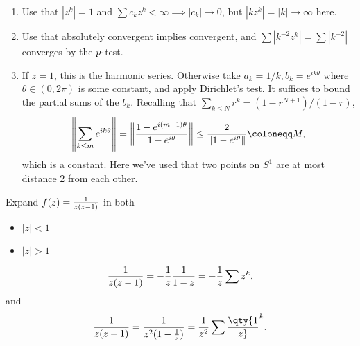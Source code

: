 \begin{solution}

\begin{enumerate}
\def\labelenumi{\arabic{enumi}.}
\tightlist
\item
  Use that \({\left\lvert {z^k} \right\rvert} = 1\) and
  \(\sum c_kz^k < \infty \implies {\left\lvert {c_k} \right\rvert} \to 0\),
  but
  \({\left\lvert {kz^k} \right\rvert} = {\left\lvert {k} \right\rvert} \to \infty\)
  here.
\item
  Use that absolutely convergent implies convergent, and
  \(\sum {\left\lvert {k^{-2} z^k} \right\rvert} = \sum {\left\lvert {k^{-2}} \right\rvert}\)
  converges by the \(p{\hbox{-}}\)test.
\item
  If \(z=1\), this is the harmonic series. Otherwise take
  \(a_k = 1/k, b_k = e^{i k \theta}\) where \(\theta \in (0, 2\pi)\) is
  some constant, and apply Dirichlet's test. It suffices to bound the
  partial sums of the \(b_k\). Recalling that
  \(\sum_{k\leq N} r^k = (1-r^{N+1}) / (1-r)\),
  \begin{align*}
    {\left\lVert { \sum_{k\leq m} e^{ik\theta } } \right\rVert} = {\left\lVert {1 - e^{i(m+1)\theta} \over 1 - e^{i\theta}} \right\rVert} \leq {2 \over {\left\lVert { 1- e^{i\theta}} \right\rVert}} \coloneqq M
    ,\end{align*}
  which is a constant. Here we've used that two points on \(S^1\) are at
  most distance 2 from each other.
\end{enumerate}

\end{solution}

\begin{exercise}

Expand \(f(z) = {1\over z(z-1)}\) in both

\begin{itemize}
\tightlist
\item
  \({\left\lvert {z} \right\rvert} < 1\)
\item
  \({\left\lvert {z} \right\rvert} > 1\)
\end{itemize}

\end{exercise}

\begin{solution}

\begin{align*}
{1\over z(z-1)} = -{1\over z}{1 \over 1-z} = -{1\over z}\sum z^k
.\end{align*}
and
\begin{align*}
{1\over z(z-1)} = {1\over z^2(1 - {1\over z})} = {1\over z^2} \sum \qty{1\over z}^k
.\end{align*}

\end{solution}

